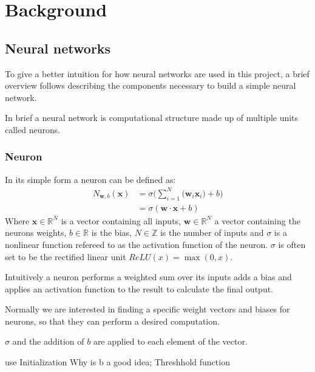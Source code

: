 \newcommand{\neuronSum}[1][N]{
	\sigma\Bigg(\sum_{i=1}^{#1}{\Big(\boldsymbol{w}_i \boldsymbol{x}_i\Big)} + b\Bigg)
}

\chapter{Background}
\section{Neural networks}
To give a better intuition for how neural networks are used in this project, a brief overview follows describing the components necessary to build a simple neural network.

In brief a neural network is computational structure made up of multiple units called neurons.

\subsection{Neuron}
In its simple form a neuron can be defined as:
\begin{equation}
\begin{split}
	N_{\boldsymbol w, b}(\boldsymbol{x}) & = \neuronSum \\
	& = \sigma (\boldsymbol{w} \cdot \boldsymbol{x} + b)
\end{split}
\end{equation}
Where $\boldsymbol{x} \in \mathbb{R}^N$ is a vector containing all inputs, $ \boldsymbol{w} \in \mathbb{R}^N$ a vector containing the neurons weights, $b \in \mathbb{R}$ is the bias, $N \in \mathbb{Z}$ is the number of inputs and $\sigma$ is a nonlinear function refereed to as the activation function of the neuron. $\sigma$ is often set to be the rectified linear unit $ReLU(x) = \max(0, x)$.

Intuitively a neuron performs a weighted sum over its inputs adds a bias and applies an activation function to the result to calculate the final output.

Normally we are interested in finding a specific weight vectors and biases for neurons, so that they can perform a desired computation.

$\sigma$ and the addition of $b$ are applied to each element of the vector.

use
Initialization
Why is b a good idea; Threshhold function

\neuronGraph{h}{$\displaystyle{\neuronSum[3]}$}

\multilayerNetworkGraph[h]

